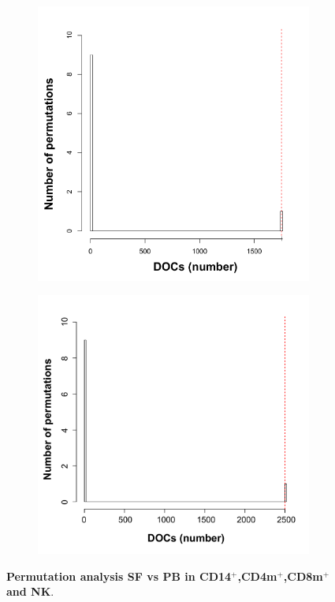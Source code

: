 \begin{figure}[H]
\begin{subfigure}[b]{0.45\textwidth}
\caption{}
\end{subfigure}
~
\begin{subfigure}[b]{0.45\textwidth} 
\centering
\includegraphics[width=\textwidth]{./Appendix/pdfs/Chapter5/ATAC_PsA_CD8_permutation_analysis}%
\caption{}
\end{subfigure}
\begin{subfigure}[b]{0.45\textwidth} 
\centering
\includegraphics[width=\textwidth]{./Appendix/pdfs/Chapter5/ATAC_PsA_NK_permutation_analysis}%
\caption{}
\end{subfigure}
\caption[Permutation analysis SF vs PB in CD14$^+$,CD4m$^+$,CD8m$^+$ and NK.]{\textbf{Permutation analysis SF vs PB in CD14$^+$,CD4m$^+$,CD8m$^+$ and NK}. }
\label{figure:PsA_perm_analysis}
\end{figure}